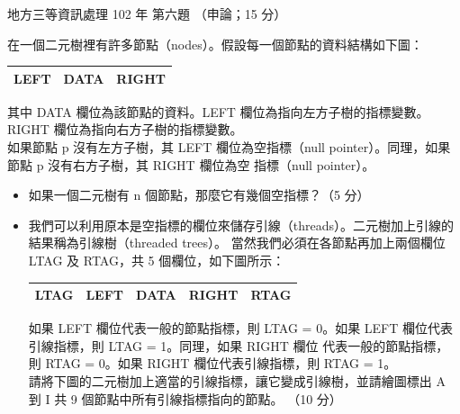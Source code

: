 \begin{pastexam}[label={px:df3-102-ds-06}]{地方三等資訊處理 102 年 第六題}
（申論；15 分）

在一個二元樹裡有許多節點（nodes）。假設每一個節點的資料結構如下圖：
\begin{center}
\begin{tabular}{|p{5em}|p{5em}|p{5em}|}
\hline
LEFT & DATA & RIGHT \\ \hline
\end{tabular}
\end{center}
其中 DATA 欄位為該節點的資料。LEFT 欄位為指向左方子樹的指標變數。RIGHT 欄位為指向右方子樹的指標變數。\\
如果節點 p 沒有左方子樹，其 LEFT 欄位為空指標（null pointer）。同理，如果節點 p 沒有右方子樹，其 RIGHT 欄位為空
指標（null pointer）。
\begin{itemize}[leftmargin=2.2em]
\item[㈠] 如果一個二元樹有 n 個節點，那麼它有幾個空指標？（5 分）
\item[㈡] 我們可以利用原本是空指標的欄位來儲存引線（threads）。二元樹加上引線的結果稱為引線樹（threaded trees）。
當然我們必須在各節點再加上兩個欄位 LTAG 及 RTAG，共 5 個欄位，如下圖所示：
\begin{center}
\begin{tabular}{|p{4em}|p{4em}|p{4em}|p{4em}|p{4em}|}
\hline
LTAG & LEFT & DATA & RIGHT & RTAG \\ \hline
\end{tabular}
\end{center}
如果 LEFT 欄位代表一般的節點指標，則 LTAG = 0。如果 LEFT 欄位代表引線指標，則 LTAG = 1。同理，如果 RIGHT 欄位
代表一般的節點指標，則 RTAG = 0。如果 RIGHT 欄位代表引線指標，則 RTAG = 1。\\
請將下圖的二元樹加上適當的引線指標，讓它變成引線樹，並請繪圖標出 A 到 I 共 9 個節點中所有引線指標指向的節點。
（10 分）
\begin{center}
\end{center}
\end{itemize}
\end{pastexam}

